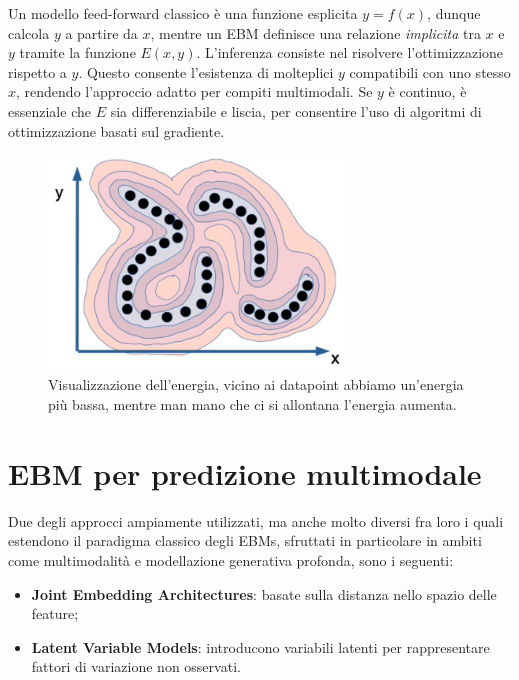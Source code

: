 Un modello feed-forward classico è una funzione esplicita $y = f(x)$, dunque calcola $y$ a partire da $x$, mentre un EBM definisce una relazione \textit{implicita} tra $x$ e $y$ tramite la funzione $E(x, y)$. L'inferenza consiste nel risolvere l'ottimizzazione rispetto a $y$. Questo consente l'esistenza di molteplici $y$ compatibili con uno stesso $x$, rendendo l'approccio adatto per compiti multimodali. Se $y$ è continuo, è essenziale che $E$ sia differenziabile e liscia, per consentire l'uso di algoritmi di ottimizzazione basati sul gradiente.

\begin{figure}
    \centering
    \includegraphics[width=0.7\textwidth]{figure/LowEnHighEn.png}
    \caption{Visualizzazione dell'energia, vicino ai datapoint abbiamo un'energia più bassa, mentre man mano che ci si allontana l'energia aumenta.}
    \label{fig:lEnhEn}
\end{figure}

\section{EBM per predizione multimodale}

Due degli approcci ampiamente utilizzati, ma anche molto diversi fra loro i quali estendono il paradigma classico degli EBMs, sfruttati in particolare in ambiti come multimodalità e modellazione generativa profonda, sono i seguenti:

\begin{itemize}
    \item \textbf{Joint Embedding Architectures}: basate sulla distanza nello spazio delle feature;
    \item \textbf{Latent Variable Models}: introducono variabili latenti per rappresentare fattori di variazione non osservati.
\end{itemize}

